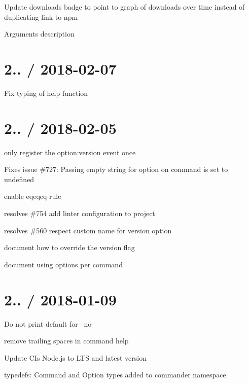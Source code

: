 
\begin{DoxyItemize}
\item Update downloads badge to point to graph of downloads over time instead of duplicating link to npm
\item Arguments description
\end{DoxyItemize}

\section*{2.. / 2018-\/02-\/07 }


\begin{DoxyItemize}
\item Fix typing of help function
\end{DoxyItemize}

\section*{2.. / 2018-\/02-\/05 }


\begin{DoxyItemize}
\item only register the option\+:version event once
\item Fixes issue \#727\+: Passing empty string for option on command is set to undefined
\item enable eqeqeq rule
\item resolves \#754 add linter configuration to project
\item resolves \#560 respect custom name for version option
\item document how to override the version flag
\item document using options per command
\end{DoxyItemize}

\section*{2.. / 2018-\/01-\/09 }


\begin{DoxyItemize}
\item Do not print default for --no-\/
\item remove trailing spaces in command help
\item Update CI\textquotesingle{}s Node.\+js to L\+TS and latest version
\item typedefs\+: Command and Option types added to commander namespace
\end{DoxyItemize}

